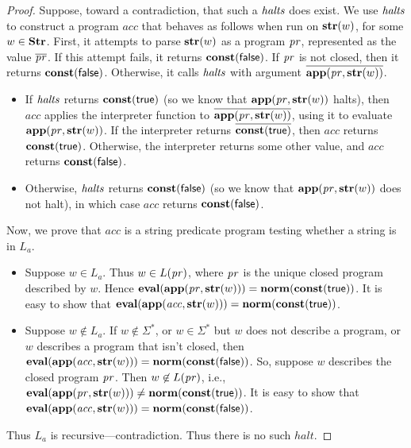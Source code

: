 \begin{proof}
Suppose, toward a contradiction, that such a $\mathit{halts}$ does exist.  We
use $\mathit{halts}$ to construct a program $\mathit{acc}$ that behaves as
follows when run on $\mathbf{str}(w)$, for some $w\in\mathbf{Str}$.  First, it
attempts to parse $\mathbf{str}(w)$ as a program $\mathit{pr}$, represented as
the value $\overline{\mathit{pr}}$.  If this attempt fails, it returns
$\mathbf{const}(\mathsf{false})$.  If $\mathit{pr}$ is not closed, then it returns
$\mathbf{const}(\mathsf{false})$.  Otherwise, it calls $\mathit{halts}$ with argument
$\overline{\mathbf{app}(\mathit{pr},\mathbf{str}(w))}$.

\begin{itemize}
\item If $\mathit{halts}$ returns $\mathbf{const}(\mathsf{true})$ (so we know that
  $\mathbf{app}(\mathit{pr},\mathbf{str}(w))$ halts), then $\mathit{acc}$ applies the
  interpreter function to $\overline{\mathbf{app}(\mathit{pr},\mathbf{str}(w))}$,
  using it to evaluate $\mathbf{app}(\mathit{pr},\mathbf{str}(w))$.  If the
  interpreter returns $\overline{\mathbf{const}(\mathsf{true})}$, then
  $\mathit{acc}$ returns $\mathbf{const}(\mathsf{true})$.  Otherwise, the
  interpreter returns some other value, and $\mathit{acc}$ returns
  $\mathbf{const}(\mathsf{false})$.

\item Otherwise, $\mathit{halts}$ returns $\mathbf{const}(\mathsf{false})$ (so we know that
  $\mathbf{app}(\mathit{pr},\mathbf{str}(w))$ does not halt), in which case
  $\mathit{acc}$ returns $\mathbf{const}(\mathsf{false})$.
\end{itemize}

Now, we prove that $\mathit{acc}$ is a string predicate program
testing whether a string is in $L_a$.

\begin{itemize}
\item Suppose $w\in L_a$.  Thus $w\in L(\mathit{pr})$, where $\mathit{pr}$ is the
  unique closed program described by $w$.  Hence
  $\mathbf{eval}(\mathbf{app}(\mathit{pr},\mathbf{str}(w))) = \mathbf{norm}(\mathbf{const}(\mathsf{true}))$.  It
  is easy to show that $\mathbf{eval}(\mathbf{app}(\mathit{acc},\mathbf{str}(w))) =
  \mathbf{norm}(\mathbf{const}(\mathsf{true}))$.

\item Suppose $w\not\in L_a$.  If $w\not\in\Sigma^*$, or
  $w\in\Sigma^*$ but $w$ does not describe a program, or $w$ describes
  a program that isn't closed, then $\mathbf{eval}(\mathbf{app}(\mathit{acc},\mathbf{str}(w)))
  = \mathbf{norm}(\mathbf{const}(\mathsf{false}))$.  So, suppose $w$ describes the closed
  program $\mathit{pr}$.  Then $w\not\in L(\mathit{pr})$, i.e.,
  $\mathbf{eval}(\mathbf{app}(\mathit{pr},\mathbf{str}(w))) \neq \mathbf{norm}(\mathbf{const}(\mathsf{true}))$.
  It is easy to show that $\mathbf{eval}(\mathbf{app}(\mathit{acc},\mathbf{str}(w))) =
  \mathbf{norm}(\mathbf{const}(\mathsf{false}))$.
\end{itemize}

Thus $L_a$ is recursive---contradiction.  Thus there is no such
$\mathit{halt}$.
\end{proof}

